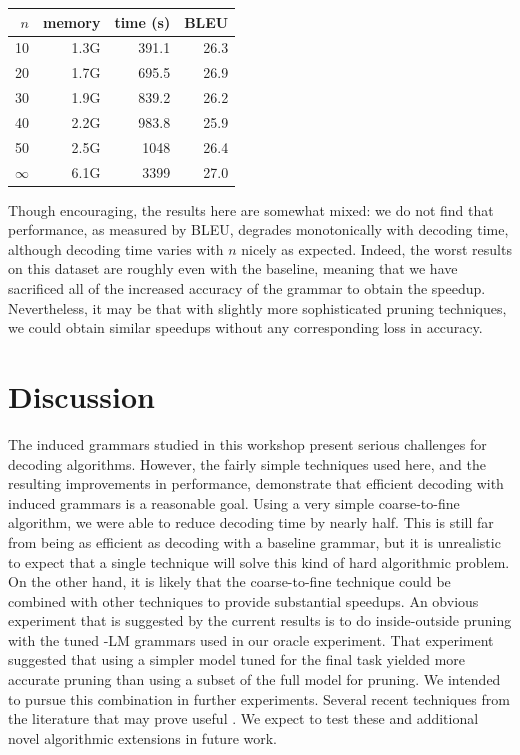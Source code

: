 \begin{table}
	\begin{tabular}{rrrr} \hline
		$n$ & memory & time (s) & BLEU \\ \hline \hline
		10 & 1.3G & 391.1 & 26.3\\
		20 & 1.7G & 695.5 & 26.9\\
		30 & 1.9G & 839.2 & 26.2\\
		40 & 2.2G & 983.8 & 25.9\\
		50 & 2.5G & 1048 & 26.4\\
		$\infty$ & 6.1G & 3399  & 27.0\\ \hline 
	\end{tabular}
\end{table}

Though encouraging, the results here are somewhat mixed: we do not find that performance, as measured by BLEU, degrades monotonically with decoding time, although decoding time varies with $n$ nicely as expected.  Indeed, the worst results on this dataset are roughly even with the baseline, meaning that we have sacrificed all of the increased accuracy of the grammar to obtain the speedup.  Nevertheless, it may be that with slightly more sophisticated pruning techniques, we could obtain similar speedups without any corresponding loss in accuracy.
 
\section{Discussion}

The induced grammars studied in this workshop present serious challenges for decoding algorithms.  However, the fairly simple techniques used here, and the resulting improvements in performance, demonstrate that efficient decoding with induced grammars is a reasonable goal.  Using a very simple coarse-to-fine algorithm, we were able to reduce decoding time by nearly half.  This is still far from being as efficient as decoding with a baseline grammar, but it is unrealistic to expect that a single technique will solve this kind of hard algorithmic problem.  On the other hand, it is likely that the coarse-to-fine technique could be combined with other techniques to provide substantial speedups.  An obvious experiment that is suggested by the current results is to do inside-outside pruning with the tuned -LM grammars used in our oracle experiment.  That experiment suggested that using a simpler model tuned for the final task yielded more accurate pruning than using a subset of the full model for pruning.  We intended to pursue this combination in further experiments.  Several recent techniques from the literature that may prove useful \citep{denero-EtAl:2009:NAACLHLT09,denero-pauls-klein:2009:Short,hopkins-langmead:2009:EMNLP}.  We expect to test these and additional novel algorithmic extensions in future work.



